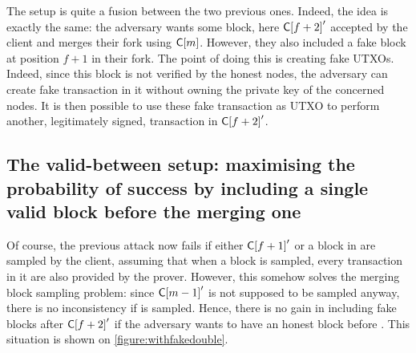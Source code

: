     The setup is quite a fusion between the two previous ones. Indeed, the idea is exactly the same: the adversary wants some block, here \(\mathsf{C[}f+2\mathsf{]}'\) accepted by the client and merges their fork using \(\mathsf{C[}m\mathsf{]}\). However, they also included a fake block at position \(f+1\) in their fork. The point of doing this is creating fake UTXOs. Indeed, since this block is not verified by the honest nodes, the adversary can create fake transaction in it without owning the private key of the concerned nodes. It is then possible to use these fake transaction as UTXO to perform another, legitimately signed, transaction in \(\mathsf{C[}f+2\mathsf{]}'\).
    
    \subsection{The valid-between setup: maximising the probability of success by including a single valid block before the merging one}
    
    Of course, the previous attack now fails if either \(\mathsf{C[}f+1\mathsf{]}'\) or a block in  are sampled by the client, assuming that when a block is sampled, every transaction in it are also provided by the prover. However, this somehow solves the merging block sampling problem: since \(\mathsf{C[}m-1\mathsf{]}'\) is not supposed to be sampled anyway, there is no inconsistency if  is sampled. Hence, there is no gain in including fake blocks after \(\mathsf{C[}f+2\mathsf{]}'\) if the adversary wants to have an honest block before . This situation is shown on \autoref{figure:withfakedouble}.

